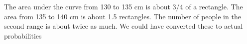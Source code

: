 The area under the curve from 130 to 135 cm is about 3/4 of a rectangle. The area from
135 to 140 cm is about 1.5 rectangles. The number of people in the second range is
about twice as much. We could have converted these to actual probabilities



